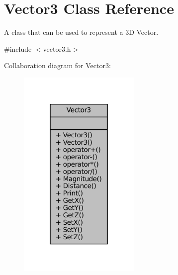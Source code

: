 \hypertarget{classVector3}{}\section{Vector3 Class Reference}
\label{classVector3}


A class that can be used to represent a 3D Vector.  




{\ttfamily \#include $<$vector3.\+h$>$}



Collaboration diagram for Vector3\+:\nopagebreak
\begin{figure}[H]
\begin{center}
\leavevmode
\includegraphics[width=166pt]{classVector3__coll__graph}
\end{center}
\end{figure}
